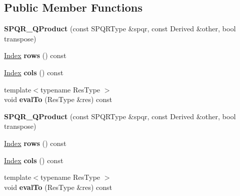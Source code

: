 \subsection*{Public Member Functions}
\begin{DoxyCompactItemize}
\item 
\mbox{\label{struct_eigen_1_1_s_p_q_r___q_product_a4dd7813eee45cf4b534557d964f721fe}} 
{\bfseries S\+P\+Q\+R\+\_\+\+Q\+Product} (const S\+P\+Q\+R\+Type \&spqr, const Derived \&other, bool transpose)
\item 
\mbox{\label{struct_eigen_1_1_s_p_q_r___q_product_ae51a3abe06dee2e628d61f444b54eddf}} 
\hyperlink{namespace_eigen_a62e77e0933482dafde8fe197d9a2cfde}{Index} {\bfseries rows} () const
\item 
\mbox{\label{struct_eigen_1_1_s_p_q_r___q_product_acfe8d7db5646002d38c21ff963510510}} 
\hyperlink{namespace_eigen_a62e77e0933482dafde8fe197d9a2cfde}{Index} {\bfseries cols} () const
\item 
\mbox{\label{struct_eigen_1_1_s_p_q_r___q_product_a753f511cb03accd8afc20041748b6287}} 
{\footnotesize template$<$typename Res\+Type $>$ }\\void {\bfseries eval\+To} (Res\+Type \&res) const
\item 
\mbox{\label{struct_eigen_1_1_s_p_q_r___q_product_a4dd7813eee45cf4b534557d964f721fe}} 
{\bfseries S\+P\+Q\+R\+\_\+\+Q\+Product} (const S\+P\+Q\+R\+Type \&spqr, const Derived \&other, bool transpose)
\item 
\mbox{\label{struct_eigen_1_1_s_p_q_r___q_product_ae51a3abe06dee2e628d61f444b54eddf}} 
\hyperlink{namespace_eigen_a62e77e0933482dafde8fe197d9a2cfde}{Index} {\bfseries rows} () const
\item 
\mbox{\label{struct_eigen_1_1_s_p_q_r___q_product_acfe8d7db5646002d38c21ff963510510}} 
\hyperlink{namespace_eigen_a62e77e0933482dafde8fe197d9a2cfde}{Index} {\bfseries cols} () const
\item 
\mbox{\label{struct_eigen_1_1_s_p_q_r___q_product_a753f511cb03accd8afc20041748b6287}} 
{\footnotesize template$<$typename Res\+Type $>$ }\\void {\bfseries eval\+To} (Res\+Type \&res) const
\end{DoxyCompactItemize}
